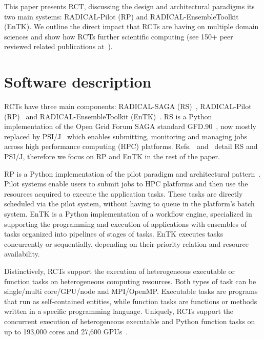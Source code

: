 \documentclass[preprint,12pt, a4paper]{elsarticle}
\begin{document}
This paper presents RCT, discussing the design and architectural paradigms its two main systems: RADICAL-Pilot (RP) and RADICAL-EnsembleToolkit (EnTK). We outline the direct impact that RCTs are having on multiple domain sciences and show how RCTs further scientific computing (see 150+ peer reviewed related publications at~\cite{radical-pub-url,scholar-pub-url}).



\section{Software description}\label{sec:description}


RCTs have three main components: RADICAL-SAGA (RS)~\cite{merzky2015saga}, RADICAL-Pilot (RP)~\cite{merzky2018using} and RADICAL-EnsembleToolkit (EnTK)~\cite{balasubramanian2016ensemble,balasubramanian2018harnessing}. RS is a Python implementation of the Open Grid Forum SAGA standard GFD.90~\cite{tom2006saga}, now mostly replaced by PSI/J~\cite{hategan2023psi} which enables submitting, monitoring and managing jobs across high performance computing (HPC) platforms. Refs.~\cite{merzky2015saga} and~\cite{hategan2023psi} detail RS and PSI/J, therefore we focus on RP and EnTK in the rest of the paper.

RP is a Python implementation of the pilot paradigm and architectural pattern~\cite{turilli2018comprehensive,luckow2012p}. Pilot systems enable users to submit jobs to HPC platforms and then use the resources acquired to execute the application tasks. These tasks are directly scheduled via the pilot system, without having to queue in the platform's batch system. EnTK is a Python implementation of a workflow engine, specialized in supporting the programming and execution of applications with ensembles of tasks organized into pipelines of stages of tasks. EnTK executes tasks concurrently or sequentially, depending on their priority relation and resource availability.

Distinctively, RCTs support the execution of heterogeneous executable or function tasks on heterogeneous computing resources. Both types of task can be single/multi core/GPU/node and MPI/OpenMP\@. Executable tasks are programs that run as self-contained entities, while function tasks are functions or methods written in a specific programming language. Uniquely, RCTs support the concurrent execution of heterogeneous executable and Python function tasks on up to 193,000 cores and 27,600 GPUs~\cite{merzky2021design}.
\end{document}
